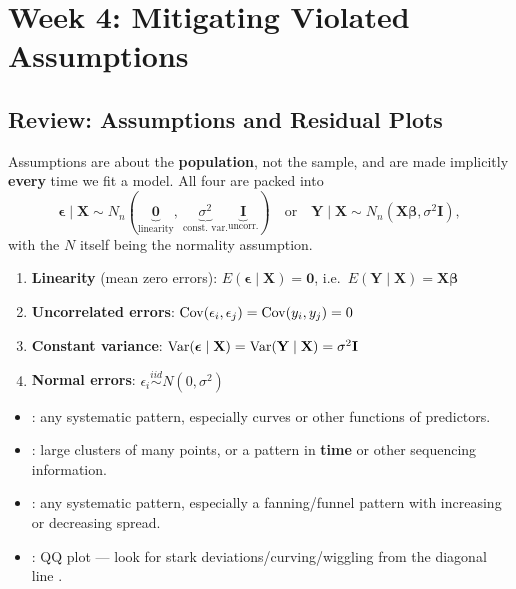
\section{Week 4: Mitigating Violated Assumptions}

\subsection{Review: Assumptions and Residual Plots}

\begin{remark}
    Assumptions are about the \textbf{population}, not the sample, and are
    made implicitly \textbf{every} time we fit a model. All four are packed into
    \[\boldsymbol\epsilon\mid\mathbf{X}\sim N_n(\underbrace{\mathbf{0}}_{\text{linearity}},\ \underbrace{\sigma^2}_{\text{const.\ var.}}\underbrace{\mathbf{I}}_{\text{uncorr.}})
    \quad\text{or}\quad \mathbf{Y}\mid\mathbf{X}\sim N_n(\mathbf{X}\boldsymbol\beta,\sigma^2\mathbf{I}),\]
    with the $N$ itself being the normality assumption.
    \begin{enumerate}
        \item \textbf{Linearity} (mean zero errors): $E(\boldsymbol\epsilon\mid\mathbf{X})=\mathbf{0}$, i.e.\ $E(\mathbf{Y}\mid\mathbf{X})=\mathbf{X}\boldsymbol\beta$
        \item \textbf{Uncorrelated errors}: $\operatorname{Cov}(\epsilon_i,\epsilon_j)=\operatorname{Cov}(y_i,y_j)=0$
        \item \textbf{Constant variance}: $\operatorname{Var}(\boldsymbol\epsilon\mid\mathbf{X})=\operatorname{Var}(\mathbf{Y}\mid\mathbf{X})=\sigma^2\mathbf{I}$
        \item \textbf{Normal errors}: $\epsilon_i\overset{iid}\sim N(0,\sigma^2)$
    \end{enumerate}
\end{remark}

\begin{itemize}
    \item {}: any systematic pattern, especially curves or other functions of predictors.
    \item {}: large clusters of many points, or a pattern in \textbf{time}
    or other sequencing information. 
    \item {}: any systematic pattern, especially a fanning/funnel pattern
    with increasing or decreasing spread.
    \item {}: QQ plot --- look for stark deviations/curving/wiggling from the
    diagonal line .
\end{itemize}

